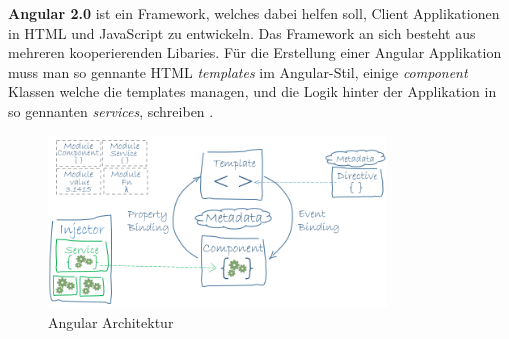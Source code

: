 \textbf{Angular 2.0} ist ein Framework, welches dabei helfen soll, Client Applikationen in HTML und JavaScript zu entwickeln. Das Framework an sich besteht aus mehreren kooperierenden Libaries. Für die Erstellung einer Angular Applikation muss man so gennante HTML \textit{templates} im Angular-Stil, einige \textit{component} Klassen welche die templates managen, und die Logik hinter der Applikation in so gennanten \textit{services}, schreiben \cite{MELD.CH3-web-app.angular}.

\begin{figure}[!htb]\centering
	\includegraphics[width=0.8\textwidth]{images/angular}
	\caption{Angular Architektur \cite{MELD.CH3-web-app.angular}}
\end{figure}



